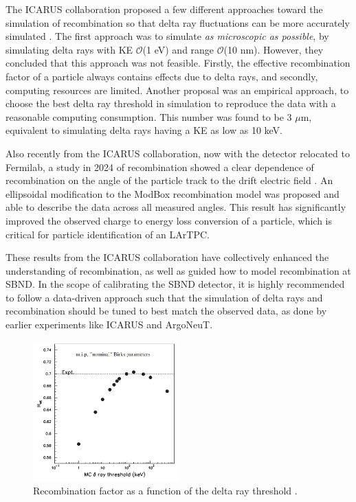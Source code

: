 The ICARUS collaboration proposed a few different approaches toward the simulation of recombination so that delta ray fluctuations can be more accurately simulated \cite{icarus_recomb}. 
The first approach was to simulate \textit{as microscopic as possible}, by simulating delta rays with KE $\mathcal{O}$(1 eV) and range $\mathcal{O}$(10 nm).
However, they concluded that this approach was not feasible.
Firstly, the effective recombination factor of a particle always contains effects due to delta rays, and secondly, computing resources are limited.
Another proposal was an empirical approach, to choose the best delta ray threshold in simulation to reproduce the data with a reasonable computing consumption.
This number was found to be 3 $\mu$m, equivalent to simulating delta rays having a KE as low as 10 keV.


Also recently from the ICARUS collaboration, now with the detector relocated to Fermilab, a study in 2024 of recombination showed a clear dependence of recombination on the angle of the particle track to the drift electric field \cite{elipsoid_recomb}.
An ellipsoidal modification to the ModBox recombination model was proposed and able to describe the data across all measured angles. 
This result has significantly improved the observed charge to energy loss conversion of a particle, which is critical for particle identification of an LArTPC.   

These results from the ICARUS collaboration have collectively enhanced the understanding of recombination, as well as guided how to model recombination at SBND.
In the scope of calibrating the SBND detector, it is highly recommended to follow a data-driven approach such that the simulation of delta rays and recombination should be tuned to best match the observed data, as done by earlier experiments like ICARUS and ArgoNeuT.

\begin{figure}[hb!]
\centering 
\includegraphics[width=0.5\textwidth]{icarus_recomb}
\caption[Recombination Factor Against Delta Ray Threshold]{
Recombination factor as a function of the delta ray threshold \cite{icarus_recomb}.
}
\label{fig:icarus_recomb}
\end{figure}

